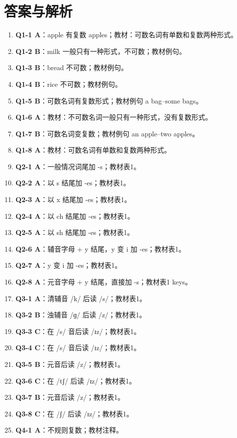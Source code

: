 \documentclass[11pt,a4paper]{ctexart}
\begin{document}
\section*{答案与解析}
\small
\begin{enumerate}[leftmargin=1.6em,itemsep=2pt]
\item \textbf{Q1-1 A}：apple 有复数 apples；教材：可数名词有单数和复数两种形式。
\item \textbf{Q1-2 B}：milk 一般只有一种形式，不可数；教材例句。
\item \textbf{Q1-3 B}：bread 不可数；教材例句。
\item \textbf{Q1-4 B}：rice 不可数；教材例句。
\item \textbf{Q1-5 B}：可数名词有复数形式；教材例句 a bag–some bags。
\item \textbf{Q1-6 A}：教材：不可数名词一般只有一种形式，没有复数形式。
\item \textbf{Q1-7 B}：可数名词变复数；教材例句 an apple–two apples。
\item \textbf{Q1-8 A}：教材：可数名词有单数和复数两种形式。
\item \textbf{Q2-1 A}：一般情况词尾加 -s；教材表1。
\item \textbf{Q2-2 A}：以 s 结尾加 -es；教材表1。
\item \textbf{Q2-3 A}：以 x 结尾加 -es；教材表1。
\item \textbf{Q2-4 A}：以 ch 结尾加 -es；教材表1。
\item \textbf{Q2-5 A}：以 sh 结尾加 -es；教材表1。
\item \textbf{Q2-6 A}：辅音字母 + y 结尾，y 变 i 加 -es；教材表1。
\item \textbf{Q2-7 A}：y 变 i 加 -es；教材表1。
\item \textbf{Q2-8 A}：元音字母 + y 结尾，直接加 -s；教材表1 keys。
\item \textbf{Q3-1 A}：清辅音 /k/ 后读 /s/；教材表1。
\item \textbf{Q3-2 B}：浊辅音 /ɡ/ 后读 /z/；教材表1。
\item \textbf{Q3-3 C}：在 /s/ 音后读 /ɪz/；教材表1。
\item \textbf{Q3-4 C}：在 /s/ 音后读 /ɪz/；教材表1。
\item \textbf{Q3-5 B}：元音后读 /z/；教材表1。
\item \textbf{Q3-6 C}：在 /tʃ/ 后读 /ɪz/；教材表1。
\item \textbf{Q3-7 B}：元音后读 /z/；教材表1。
\item \textbf{Q3-8 C}：在 /ʃ/ 后读 /ɪz/；教材表1。
\item \textbf{Q4-1 A}：不规则复数；教材注释。

\end{enumerate}
\end{document}
